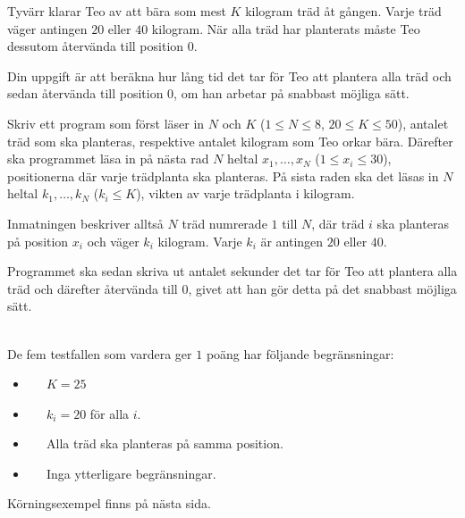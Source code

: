 Tyvärr klarar Teo av att bära som mest $K$ kilogram träd åt gången.
Varje träd väger antingen $20$ eller $40$ kilogram.
När alla träd har planterats måste Teo dessutom återvända till position $0$.

Din uppgift är att beräkna hur lång tid det tar för Teo att plantera alla träd och sedan återvända till position $0$, om han arbetar på snabbast möjliga sätt.

Skriv ett program som först läser in $N$ och $K$ ($1 \leq N \leq 8$, $20 \leq K \leq 50$), antalet träd som ska planteras, respektive antalet kilogram som Teo orkar bära.
Därefter ska programmet läsa in på nästa rad $N$ heltal $x_1, \dots, x_N$ ($1 \leq x_i \leq 30$), positionerna där varje trädplanta ska planteras. 
På sista raden ska det läsas in $N$ heltal $k_1, \dots, k_N$ ($k_i \leq K$), vikten av varje trädplanta i kilogram. 

Inmatningen beskriver alltså $N$ träd numrerade $1$ till $N$, där träd $i$ ska planteras på position $x_i$ och väger $k_i$ kilogram. 
Varje $k_i$ är antingen $20$ eller $40$.

Programmet ska sedan skriva ut antalet sekunder det tar för Teo att plantera alla träd och därefter återvända till $0$, givet att han gör detta på det snabbast möjliga sätt.

\vspace{0.5cm}
\\
De fem testfallen som vardera ger $1$ poäng har följande begränsningar:
\begin{itemize}
    \item[(1)] $\;\;\;\;$ $K=25$
    \item[(2)] $\;\;\;\;$ $k_i = 20$ för alla $i$.
    \item[(3)] $\;\;\;\;$ Alla träd ska planteras på samma position.
    \item[(4-5)] $\;\;\;\; $ Inga ytterligare begränsningar.
\end{itemize}

\vspace{0.3cm}

\begin{center}
    {\LARGE Körningsexempel finns på nästa sida.}
\end{center}

\newpage

